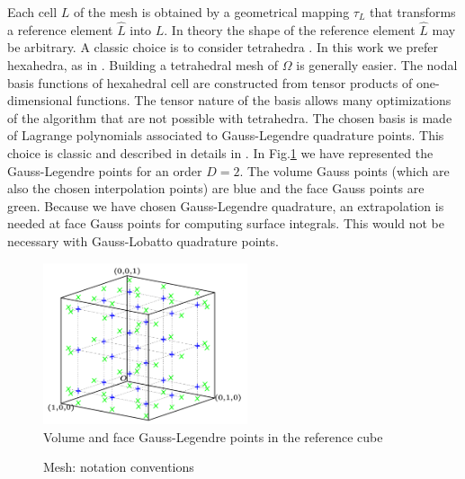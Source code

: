 \documentclass{svmult}
\begin{document}
Each cell $L$ of the mesh is obtained by a geometrical mapping
$\tau_L$ that transforms a reference element $\hat L$ into $L$.  In
theory the shape of the reference element $\hat L$ may be arbitrary. A
classic choice is to consider tetrahedra \cite{hesthaven-2009}. In
this work we prefer hexahedra, as in \cite{CFP06}. Building a
tetrahedral mesh of $\Omega$ is generally easier. The nodal basis
functions of hexahedral cell are constructed from tensor products of
one-dimensional functions. The tensor nature of the basis allows many
optimizations of the algorithm that are not possible with
tetrahedra. The chosen basis is made of Lagrange polynomials
associated to Gauss-Legendre quadrature points. This choice is classic
and described in details in \cite{hesthaven2007nodal}. In
Fig.\ref{fig:cube-pg} we have represented the Gauss-Legendre points
for an order $D=2$. The volume Gauss points (which are also the chosen
interpolation points) are blue and the face Gauss points are
green. Because we have chosen Gauss-Legendre quadrature, an
extrapolation is needed at face Gauss points for computing surface
integrals. This would not be necessary with Gauss-Lobatto quadrature
points.

\begin{figure}[h]
  \centering
  \includegraphics[width=6cm]{ref_element_pg}
  \caption{Volume and face Gauss-Legendre points in the reference
    cube\label{fig:cube-pg}}
\end{figure}

\begin{figure}
  \centering
  \caption{Mesh: notation conventions\label{fig:mesh-conv}}
\end{figure}
\end{document}
